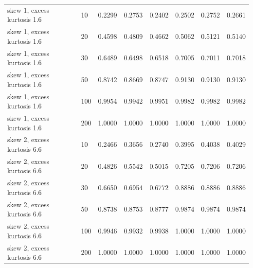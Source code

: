\begin{table}[htbp]
\begin{tabular}{llrrrrrr}
skew 1, excess kurtosis 1.6 &  10 & 0.2299 & 0.2753 & 0.2402 & 0.2502 & 0.2752 & 0.2661 \\
skew 1, excess kurtosis 1.6 &  20 & 0.4598 & 0.4809 & 0.4662 & 0.5062 & 0.5121 & 0.5140 \\
skew 1, excess kurtosis 1.6 &  30 & 0.6489 & 0.6498 & 0.6518 & 0.7005 & 0.7011 & 0.7018 \\
skew 1, excess kurtosis 1.6 &  50 & 0.8742 & 0.8669 & 0.8747 & 0.9130 & 0.9130 & 0.9130 \\
skew 1, excess kurtosis 1.6 & 100 & 0.9954 & 0.9942 & 0.9951 & 0.9982 & 0.9982 & 0.9982 \\
skew 1, excess kurtosis 1.6 & 200 & 1.0000 & 1.0000 & 1.0000 & 1.0000 & 1.0000 & 1.0000 \\
skew 2, excess kurtosis 6.6 &  10 & 0.2466 & 0.3656 & 0.2740 & 0.3995 & 0.4038 & 0.4029 \\
skew 2, excess kurtosis 6.6 &  20 & 0.4826 & 0.5542 & 0.5015 & 0.7205 & 0.7206 & 0.7206 \\
skew 2, excess kurtosis 6.6 &  30 & 0.6650 & 0.6954 & 0.6772 & 0.8886 & 0.8886 & 0.8886 \\
skew 2, excess kurtosis 6.6 &  50 & 0.8738 & 0.8753 & 0.8777 & 0.9874 & 0.9874 & 0.9874 \\
skew 2, excess kurtosis 6.6 & 100 & 0.9946 & 0.9932 & 0.9938 & 1.0000 & 1.0000 & 1.0000 \\
skew 2, excess kurtosis 6.6 & 200 & 1.0000 & 1.0000 & 1.0000 & 1.0000 & 1.0000 & 1.0000 \\
\hline
\end{tabular}
\end{table}
